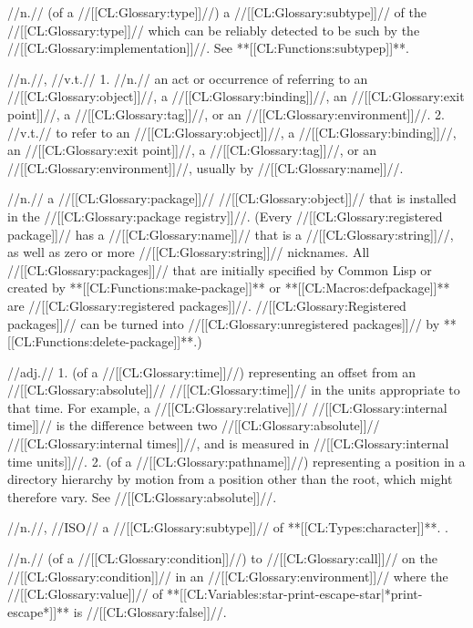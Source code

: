  //n.// (of a //[[CL:Glossary:type]]//) a //[[CL:Glossary:subtype]]// of the //[[CL:Glossary:type]]// which can be reliably detected to be such by the //[[CL:Glossary:implementation]]//. See **[[CL:Functions:subtypep]]**.

 //n.//, //v.t.// 1. //n.// an act or occurrence of referring to an //[[CL:Glossary:object]]//, a //[[CL:Glossary:binding]]//, an //[[CL:Glossary:exit point]]//, a //[[CL:Glossary:tag]]//, or an //[[CL:Glossary:environment]]//. 2. //v.t.// to refer to an //[[CL:Glossary:object]]//, a //[[CL:Glossary:binding]]//, an //[[CL:Glossary:exit point]]//, a //[[CL:Glossary:tag]]//, or an //[[CL:Glossary:environment]]//, usually by //[[CL:Glossary:name]]//.

 //n.// a //[[CL:Glossary:package]]// //[[CL:Glossary:object]]// that is installed in the //[[CL:Glossary:package registry]]//. (Every //[[CL:Glossary:registered package]]// has a //[[CL:Glossary:name]]// that is a //[[CL:Glossary:string]]//, as well as zero or more //[[CL:Glossary:string]]// nicknames. All //[[CL:Glossary:packages]]// that are initially specified by Common Lisp or created by **[[CL:Functions:make-package]]** or **[[CL:Macros:defpackage]]** are //[[CL:Glossary:registered packages]]//. //[[CL:Glossary:Registered packages]]// can be turned into //[[CL:Glossary:unregistered packages]]// by **[[CL:Functions:delete-package]]**.)

 //adj.// 1. (of a //[[CL:Glossary:time]]//) representing an offset from an //[[CL:Glossary:absolute]]// //[[CL:Glossary:time]]// in the units appropriate to that time. For example, a //[[CL:Glossary:relative]]// //[[CL:Glossary:internal time]]// is the difference between two //[[CL:Glossary:absolute]]// //[[CL:Glossary:internal times]]//, and is measured in //[[CL:Glossary:internal time units]]//. 2. (of a //[[CL:Glossary:pathname]]//) representing a position in a directory hierarchy by motion from a position other than the root, which might therefore vary.  See //[[CL:Glossary:absolute]]//.

 //n.//, //ISO// a //[[CL:Glossary:subtype]]// of **[[CL:Types:character]]**. \Seesection\CharRepertoires.

 //n.// (of a //[[CL:Glossary:condition]]//) to //[[CL:Glossary:call]]//  on the //[[CL:Glossary:condition]]// in an //[[CL:Glossary:environment]]// where the //[[CL:Glossary:value]]// of **[[CL:Variables:star-print-escape-star|*print-escape*]]** is //[[CL:Glossary:false]]//.

